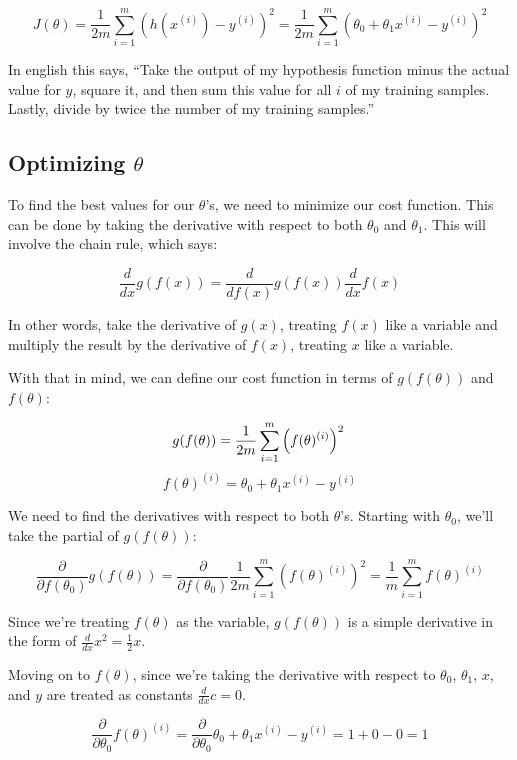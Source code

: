 \documentclass[11pt]{article}
\begin{document}
\[
J(\theta) = \frac{1}{2m} \sum_{i=1}^m \left(h(x^{(i)}) - y^{(i)}\right)^2 = \frac{1}{2m}
\sum_{i=1}^m \left(\theta_0 + \theta_1 x^{(i)} - y^{(i)}\right)^2 
\]

In english this says, ``Take the output of my hypothesis function minus the actual
value for \(y\), square it, and then sum this value for all \(i\) of my training
samples. Lastly, divide by twice the number of my training samples.''
\subsection{Optimizing \(\theta\)}
\label{sec-1-3}


To find the best values for our \(\theta\)'s, we need to minimize our cost
function. This can be done by taking the derivative with respect to both \(\theta_0\)
and \(\theta_1\). This will involve the chain rule, which says:

\[
\frac{d}{dx} g(f(x)) = \frac{d}{df(x)} g(f(x)) \frac{d}{dx} f(x)
\]

In other words, take the derivative of \(g(x)\), treating \(f(x)\) like a variable
and multiply the result by the derivative of \(f(x)\), treating \(x\) like a
variable.

With that in mind, we can define our cost function in terms of \(g(f(\theta))\) and
\(f(\theta)\): 

\[
g(f(\theta)) = \frac{1}{2m} \sum_{i=1}^m \left(f(\theta)^{(i)}\right)^2 \\
\]
\[
f(\theta)^{(i)} = \theta_0 + \theta_1 x^{(i)} - y^{(i)}
\]

We need to find the derivatives with respect to both \(\theta\)'s. Starting with
\(\theta_0\), we'll take the partial of \(g(f(\theta))\):

\[
\frac{\partial}{\partial f(\theta_0)} g(f(\theta)) = \frac{\partial}{\partial
f(\theta_0)} \frac{1}{2m} \sum_{i=1}^m \left(f(\theta)^{(i)}\right)^2 =
\frac{1}{m} \sum_{i=1}^m f(\theta)^{(i)} 
\]

Since we're treating \(f(\theta)\) as the variable, \(g(f(\theta))\) is a simple
derivative in the form of \(\frac{d}{dx} x^2 = \frac{1}{2} x\).

Moving on to \(f(\theta)\), since we're taking the derivative with respect to
\(\theta_0\), \(\theta_1\), \(x\), and \(y\) are treated as constants \(\frac{d}{dx} c
= 0\).

\[
\frac{\partial}{\partial \theta_0} f(\theta)^{(i)} = \frac{\partial}{\partial
\theta_0} \theta_0 + \theta_1 x^{(i)} - y^{(i)} = 1 + 0 - 0 = 1 
\]
\end{document}
